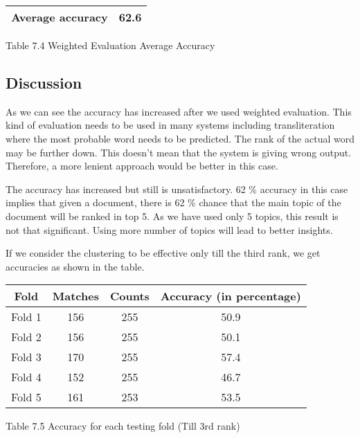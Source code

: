 \begin{center}
\begin{tabular}{ |c|c| }
  \hline
  Average accuracy & 62.6 \\ \hline
\end{tabular}
\end{center}
\begin{center}
 Table 7.4 Weighted Evaluation Average Accuracy 
\end{center}

\subsection*{Discussion}

\par
As we can see the accuracy has increased after we used weighted evaluation. This kind of evaluation needs to be used in many systems including
transliteration where the most probable word needs to be predicted. The rank of the actual word may be further down. This doesn't mean that the
system is giving wrong output. Therefore, a more lenient approach would be better in this case. 

\par
The accuracy has increased but still is unsatisfactory. 62 \% accuracy in this case implies that given a document, there is 62 \%
chance that the main topic of the document will be ranked in top 5. As we have used only 5 topics, this result is not that significant. Using
more number of topics will lead to better insights. 

\par 
If we consider the clustering to be effective only till the third rank, we get accuracies as shown in the table.

\begin{center}
\begin{tabular}{ |c|c|c|c| }
  \hline
  Fold & Matches & Counts & Accuracy (in percentage) \\ \hline
  Fold 1 & 156 & 255 & 50.9 \\ \hline
  Fold 2 & 156 & 255 & 50.1 \\ \hline
  Fold 3 & 170 & 255 & 57.4 \\ \hline
  Fold 4 & 152 & 255 & 46.7 \\ \hline
  Fold 5 & 161 & 253 & 53.5 \\ \hline
\end{tabular}
\end{center}
\begin{center}
 Table 7.5 Accuracy for each testing fold (Till 3rd rank)
\end{center}

